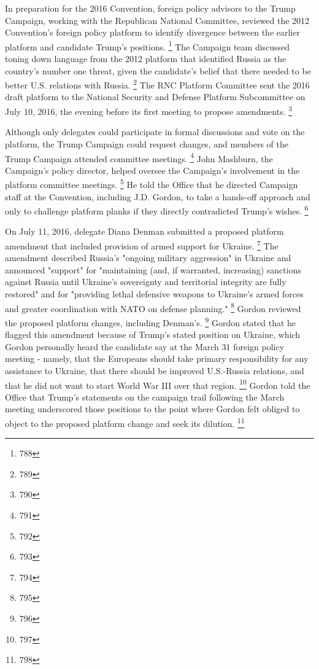 In preparation for the 2016 Convention, foreign policy advisors to the Trump Campaign, working with the Republican National Committee, reviewed the 2012 Convention's foreign policy platform to identify divergence between the earlier platform and candidate Trump's positions.%
\footnote{788}
The Campaign team discussed toning down language from the 2012 platform that identified Russia as the country's number one threat, given the candidate's belief that there needed to be better U.S. relations with Russia.%
\footnote{789}
The RNC Platform Committee sent the 2016 draft platform to the National Security and Defense Platform Subcommittee on July 10, 2016, the evening before its first meeting to propose amendments.%
\footnote{790}

Although only delegates could participate in formal discussions and vote on the platform, the Trump Campaign could request changes, and members of the Trump Campaign attended committee meetings.%
\footnote{791}
John Mashburn, the Campaign's policy director, helped oversee the Campaign's involvement in the platform committee meetings.%
\footnote{792}
He told the Office that he directed Campaign staff at the Convention, including J.D. Gordon, to take a hands-off approach and only to challenge platform planks if they directly contradicted Trump's wishes.%
\footnote{793}

On July 11, 2016, delegate Diana Denman submitted a proposed platform amendment that included provision of armed support for Ukraine.%
\footnote{794}
The amendment described Russia's "ongoing military aggression" in Ukraine and announced "support" for "maintaining (and, if warranted, increasing) sanctions against Russia until Ukraine's sovereignty and territorial integrity are fully restored" and for "providing lethal defensive weapons to Ukraine's armed forces and greater coordination with NATO on defense planning."%
\footnote{795}
Gordon reviewed the proposed platform changes, including Denman's.%
\footnote{796}
Gordon stated that he flagged this amendment because of Trump's stated position on Ukraine, which Gordon personally heard the candidate say at the March 31 foreign policy meeting - namely, that the Europeans should take primary responsibility for any assistance to Ukraine, that there should be improved U.S.-Russia relations, and that he did not want to start World War III over that region.%
\footnote{797}
Gordon told the Office that Trump's statements on the campaign trail following the March meeting underscored those positions to the point where Gordon felt obliged to object to the proposed platform change and seek its dilution.%
\footnote{798}

